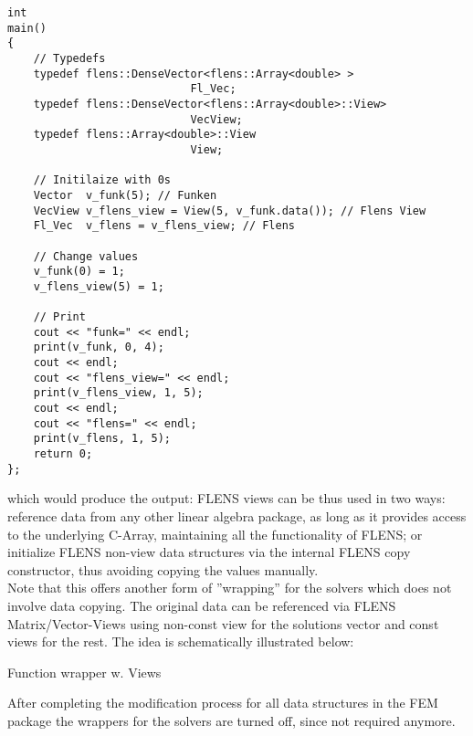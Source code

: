 \begin{lstlisting}
int
main()
{
	// Typedefs
	typedef flens::DenseVector<flens::Array<double> >
							Fl_Vec;
	typedef flens::DenseVector<flens::Array<double>::View>
							VecView;
	typedef flens::Array<double>::View
							View;
	
	// Initilaize with 0s
	Vector 	v_funk(5); // Funken
	VecView v_flens_view = View(5, v_funk.data()); // Flens View
	Fl_Vec	v_flens = v_flens_view; // Flens

	// Change values
	v_funk(0) = 1;
	v_flens_view(5) = 1;

	// Print
	cout << "funk=" << endl;
	print(v_funk, 0, 4);
	cout << endl;
	cout << "flens_view=" << endl;
	print(v_flens_view, 1, 5);
	cout << endl;
	cout << "flens=" << endl;
	print(v_flens, 1, 5);
	return 0;
};
\end{lstlisting}
which would produce the output:
FLENS views can be thus used in two ways: reference data from any other linear algebra package, as long as it provides access to the underlying C-Array, maintaining all the functionality of FLENS; or initialize FLENS non-view data structures via the internal FLENS copy constructor, thus avoiding copying the values manually.\\
Note that this offers another form of ''wrapping'' for the solvers which does not involve data copying. The original data can be referenced via FLENS Matrix/Vector-Views using non-const view for the solutions vector and const views for the rest. The idea is schematically illustrated below:
\begin{center}

\center
Function wrapper w. Views
\end{center}

After completing the modification process for all data structures in the FEM package the wrappers for the solvers are turned off, since not required anymore.

